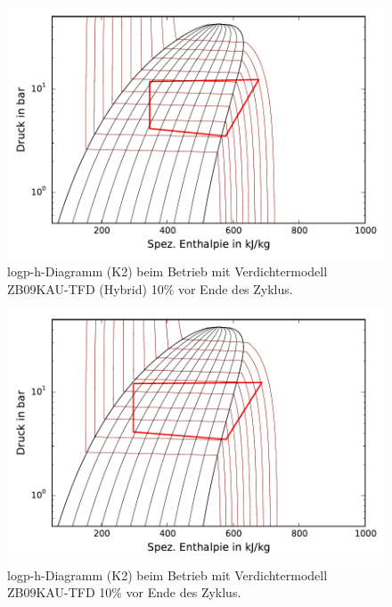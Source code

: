\begin{figure}[h!]
\centering
\includegraphics[scale=0.8]{Pictures/51/log_ph_lastCycle10perc_C2.pdf}
\caption{logp-h-Diagramm (K2) beim Betrieb mit Verdichtermodell ZB09KAU-TFD (Hybrid) \unit{10}{\%} vor Ende des Zyklus.}
\label{fig:logph51}
\end{figure}

\begin{figure}[h!]
\centering
\includegraphics[scale=0.8]{Pictures/54/log_ph_lastCycle10perc_C2.pdf}
\caption{logp-h-Diagramm (K2) beim Betrieb mit Verdichtermodell ZB09KAU-TFD \unit{10}{\%} vor Ende des Zyklus.}
\label{fig:logph54}
\end{figure}






\clearpage





